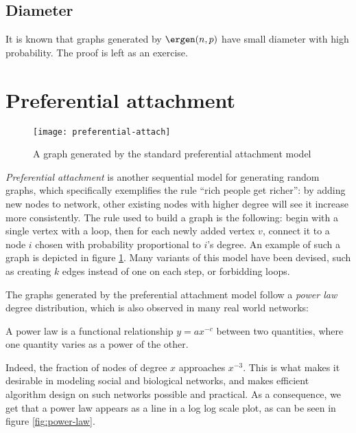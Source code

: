 \subsection{Diameter}

It is known that graphs generated by $\ergen(n,p)$ have small diameter with high probability. The proof is left as an exercise.


\section[Preferential attachment]{Preferential attachment\raisebox{.3\baselineskip}{\normalsize\footnotemark}}
\label{sec:pref-att}

\begin{figure}
    \centering
    \texttt{[image: preferential-attach]}
    \caption{A graph generated by the standard preferential attachment model}
    \label{fig:pref-att}
\end{figure}

\emph{Preferential attachment} is another sequential model for generating random graphs, which specifically exemplifies the rule ``rich people get richer'': by adding new nodes to network, other existing nodes with higher degree will see it increase more consistently. The rule used to build a graph is the following: begin with a single vertex with a loop, then for each newly added vertex $v$, connect it to a node $i$ chosen with probability proportional to $i$'s degree. An example of such a graph is depicted in figure \ref{fig:pref-att}. Many variants of this model have been devised, such as creating $k$ edges instead of one on each step, or forbidding loops.

The graphs generated by the preferential attachment model follow a \emph{power law} degree distribution, which is also observed in many real world networks: 

\begin{defn}
    A power law is a functional relationship $y = ax^{-c}$ between two quantities, where one quantity varies as a power of the other.
\end{defn}

Indeed, the fraction of nodes of degree $x$ approaches $x^{-3}$. This is what makes it desirable in modeling social and biological networks, and makes efficient algorithm design on such networks possible and practical. As a consequence, we get that a power law appears as a line in a log log scale plot, as can be seen in figure \ref{fig:power-law}.

